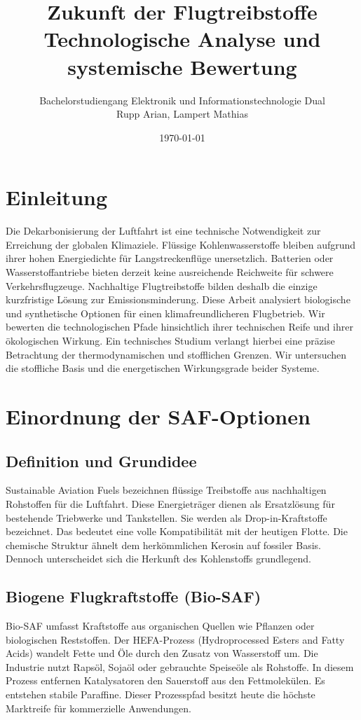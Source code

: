 \documentclass[12pt,a4paper]{article}
\title{Zukunft der Flugtreibstoffe \\ Technologische Analyse und systemische Bewertung}
\author{Bachelorstudiengang Elektronik und Informationstechnologie Dual \\ Rupp Arian, Lampert Mathias}
\date{\today}
\begin{document}
\maketitle
\tableofcontents
\newpage

\section{Einleitung}
Die Dekarbonisierung der Luftfahrt ist eine technische Notwendigkeit zur Erreichung der globalen Klimaziele. Flüssige Kohlenwasserstoffe bleiben aufgrund ihrer hohen Energiedichte für Langstreckenflüge unersetzlich. Batterien oder Wasserstoffantriebe bieten derzeit keine ausreichende Reichweite für schwere Verkehrsflugzeuge. Nachhaltige Flugtreibstoffe bilden deshalb die einzige kurzfristige Lösung zur Emissionsminderung. Diese Arbeit analysiert biologische und synthetische Optionen für einen klimafreundlicheren Flugbetrieb. Wir bewerten die technologischen Pfade hinsichtlich ihrer technischen Reife und ihrer ökologischen Wirkung. Ein technisches Studium verlangt hierbei eine präzise Betrachtung der thermodynamischen und stofflichen Grenzen. Wir untersuchen die stoffliche Basis und die energetischen Wirkungsgrade beider Systeme.

\section{Einordnung der SAF-Optionen}

\subsection{Definition und Grundidee}
Sustainable Aviation Fuels bezeichnen flüssige Treibstoffe aus nachhaltigen Rohstoffen für die Luftfahrt. Diese Energieträger dienen als Ersatzlösung für bestehende Triebwerke und Tankstellen. Sie werden als Drop-in-Kraftstoffe bezeichnet. Das bedeutet eine volle Kompatibilität mit der heutigen Flotte. Die chemische Struktur ähnelt dem herkömmlichen Kerosin auf fossiler Basis. Dennoch unterscheidet sich die Herkunft des Kohlenstoffs grundlegend. 

\subsection{Biogene Flugkraftstoffe (Bio-SAF)}
Bio-SAF umfasst Kraftstoffe aus organischen Quellen wie Pflanzen oder biologischen Reststoffen. Der HEFA-Prozess (Hydroprocessed Esters and Fatty Acids) wandelt Fette und Öle durch den Zusatz von Wasserstoff um. Die Industrie nutzt Rapsöl, Sojaöl oder gebrauchte Speiseöle als Rohstoffe. In diesem Prozess entfernen Katalysatoren den Sauerstoff aus den Fettmolekülen. Es entstehen stabile Paraffine. Dieser Prozesspfad besitzt heute die höchste Marktreife für kommerzielle Anwendungen. 
\end{document}

